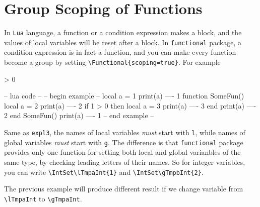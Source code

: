 \documentclass[oneside]{book}
\begin{document}
\section{Group Scoping of Functions}

In \verb!Lua! language, a function or a condition expression makes a block,
and the values of local variables will be reset after a block.
In \verb!functional! package, a condition expression is in fact a function,
and you can make every function become a group by setting
\verb!\Functional{scoping=true}!. For example

\begin{minipage}{0.58\textwidth}
\begin{codehigh}
\IgnoreSpacesOn
\IntSet {}
\IntVarLog \lTmpaInt            %
\PrgNewFunction \SomeFun { } {
  \IntSet {}
  \IntVarLog \lTmpaInt          %
   > {0} {
    \IntSet {}
    \IntVarLog \lTmpaInt        %
  }{ }
  \IntVarLog \lTmpaInt          %
}
\SomeFun
\IntVarLog \lTmpaInt            %
\IgnoreSpacesOff
\end{codehigh}
\end{minipage}%
\begin{minipage}{0.42\textwidth}
\begin{code}
-- lua code --
-- begin example --
local a = 1
print(a)            ---- 1
function SomeFun()
  local a = 2
  print(a)          ---- 2
  if 1 > 0 then
    local a = 3
    print(a)        ---- 3
  end
  print(a)          ---- 2
end
SomeFun()
print(a)            ---- 1
-- end example --
\end{code}
\end{minipage}

Same as \verb!expl3!, the names of local variables \emph{must} start with \verb!l!,
while names of global variables \emph{must} start with \verb!g!.
The difference is that \verb!functional! package provides only one function for setting
both local and global varianbles of the same type,
by checking leading letters of their names. So for integer variables, you can write
\verb!\IntSet\lTmpaInt{1}! and \verb!\IntSet\gTmpbInt{2}!.

The previous example will produce different result
if we change variable from \verb!\lTmpaInt! to \verb!\gTmpaInt!.
\end{document}
